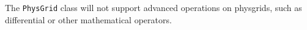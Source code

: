 


The {\tt PhysGrid} class will not support advanced
operations on physgrids, such as differential or other
mathematical operators.



